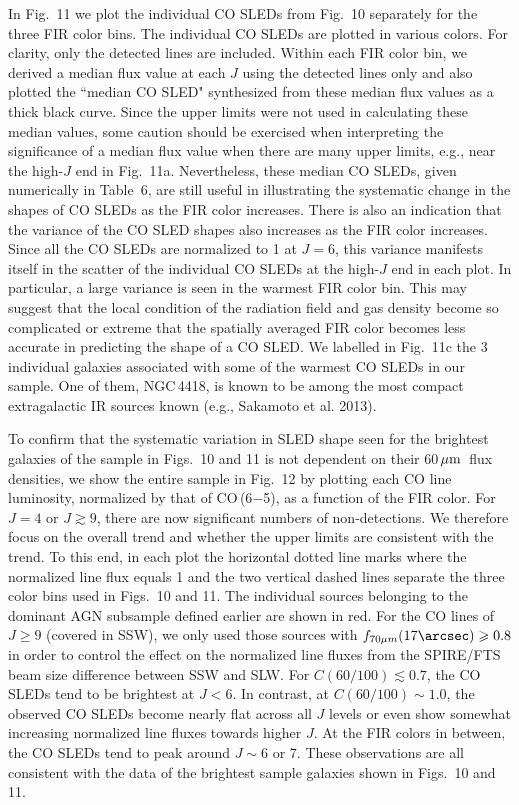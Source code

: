 \documentclass[preprint]{aastex}
\newcommand{\um}{\mbox{$\,\mu{\rm m}$}}
\begin{document}
In Fig.~11 we plot the individual CO SLEDs from Fig.~10 separately for the three
FIR color bins.  The individual CO SLEDs are plotted in various colors.  For clarity,
only the detected lines are included.  Within each FIR color bin, we derived
a median flux value at each $J$ using the detected lines only and also plotted 
the ``median CO SLED" synthesized from these median flux values as a thick black
curve.   Since the upper limits were not used in calculating these median values, 
some caution should be exercised when interpreting the significance of a median flux 
value when there are many upper limits, e.g., near the high-$J$ end in Fig.~11a.   
Nevertheless, these median CO SLEDs, given numerically in Table~6, are still useful
in illustrating the systematic change in the shapes of CO SLEDs as the FIR color 
increases.  There is also 
an indication that the variance of the CO SLED shapes also increases as the FIR
color increases.  Since all the CO SLEDs are normalized to 1 at $J = 6$, this 
variance manifests itself in the scatter of the individual CO SLEDs at the high-$J$
end in each plot.   In particular, a large variance is seen in the warmest FIR 
color bin.   This may suggest that the local condition of the radiation field and 
gas density become so complicated or extreme that the spatially averaged FIR color 
becomes less accurate in predicting the shape of a CO SLED.  We labelled in Fig.~11c 
the 3 individual galaxies associated with some of the warmest CO SLEDs in our sample. 
One of them, NGC\,4418, is known to be among the most compact extragalactic IR 
sources known (e.g., Sakamoto et al. 2013).


To confirm that the systematic variation in SLED shape seen for the brightest galaxies
of the sample in Figs.~10 and 11 is not dependent on their 60\um\ flux densities, 
we show the entire sample in Fig.~12 by plotting each CO line luminosity, normalized
by that of CO\,(6$-$5), as a function of the FIR color.  For $J = 4$ or $J \gtrsim 9$, 
there are now significant numbers of non-detections.  We therefore focus on 
the overall trend and whether the upper limits are consistent with the trend. 
To this end, in each plot the horizontal dotted line marks where the normalized 
line flux equals 1 and the two vertical dashed lines separate the three color bins
used in Figs.~10 and 11. 
The individual sources belonging to the dominant AGN subsample defined earlier 
are shown in red.  For the CO lines of $J \geqslant 9$ (covered in SSW), we only 
used those sources with $f_{70 \mu m}(17\arcsec) \geqslant 0.8$ in order to control
the effect on the normalized line fluxes from the SPIRE/FTS beam size difference 
between SSW and SLW.  For $C(60/100) \lesssim 0.7$, the CO SLEDs 
tend to be brightest at $J < 6$. In contrast, at $C(60/100) \sim 1.0$, the observed
CO SLEDs become nearly flat across all $J$ levels or even show somewhat increasing
normalized line fluxes towards higher $J$.   At the FIR colors in between, the CO 
SLEDs tend to peak around $J \sim 6$ or 7.   These observations are all consistent 
with the data of the brightest sample galaxies shown in Figs.~10 and 11.
\end{document}

